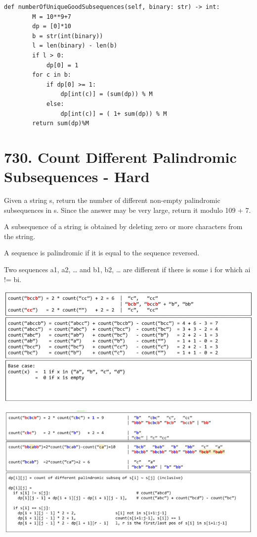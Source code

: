 \documentclass[9pt, b5paaper]{book}
\begin{document}
\begin{verbatim}
def numberOfUniqueGoodSubsequences(self, binary: str) -> int:
        M = 10**9+7
        dp = [0]*10
        b = str(int(binary))
        l = len(binary) - len(b)
        if l > 0:
            dp[0] = 1
        for c in b:
            if dp[0] >= 1:
                dp[int(c)] = (sum(dp)) % M
            else:
                dp[int(c)] = ( 1+ sum(dp)) % M
        return sum(dp)%M
\end{verbatim}
\section{730. Count Different Palindromic Subsequences - Hard}
\label{sec-1-10}
Given a string s, return the number of different non-empty palindromic subsequences in s. Since the answer may be very large, return it modulo 109 + 7.

A subsequence of a string is obtained by deleting zero or more characters from the string.

A sequence is palindromic if it is equal to the sequence reversed.

Two sequences a1, a2, \ldots{} and b1, b2, \ldots{} are different if there is some i for which ai != bi.

\includegraphics[width=.9\linewidth]{./pic/palindromSubSeq.png}

\includegraphics[width=.9\linewidth]{./pic/palindromSubSeq2.png}
\end{document}
